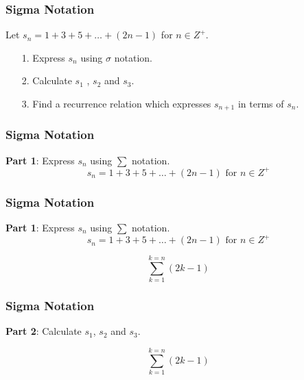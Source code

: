 

\begin{frame}
	\frametitle{Sigma Notation}
	\Large
	\vspace{-1cm}
	Let $s_n = 1 + 3 + 5 + \ldots + (2n-1)$ for $n \in Z^{+}$.\\
	\bigskip
	\begin{itemize}
		\item[1.] Express $s_n$ using $\sigma$ notation. \\
		\bigskip
		\item[2.] Calculate $s_1$ , $s_2$ and $s_3$. \\
		\bigskip
		\item[3.] Find a recurrence relation which expresses $s_{n+1}$ in terms of $s_n$.
	\end{itemize}
\end{frame}
\begin{frame}
	\frametitle{Sigma Notation}
	\Large
	\vspace{-2.3cm}
	\textbf{Part 1}: Express $s_n$ using $\sum$ notation.
	\[s_n = 1 + 3 + 5 + \ldots + (2n-1) \mbox{   for }n \in Z^{+}\]
	
	
	
\end{frame}
\begin{frame}
	\frametitle{Sigma Notation}
	\Large
	\vspace{-1cm}
	\textbf{Part 1}: Express $s_n$ using $\sum$ notation.
	\[s_n = 1 + 3 + 5 + \ldots + (2n-1) \mbox{   for }n \in Z^{+}\]
	
	{
		\LARGE
		\[  \sum^{k=n}_{k=1} (2k-1) \]
	}
\end{frame}
\begin{frame}
	\frametitle{Sigma Notation}
	\Large
	\vspace{-2.3cm}
	\textbf{Part 2}: Calculate $s_1$, $s_2$ and $s_3$.
	
	{
		\LARGE
		\[  \sum^{k=n}_{k=1} (2k-1) \]
	}
	
	
	
\end{frame}
